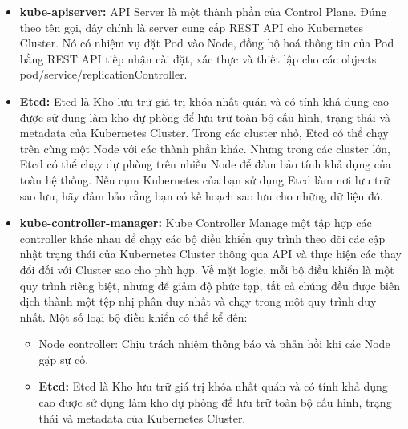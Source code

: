 \documentclass[12pt,a4paper]{report}
\begin{document}
	\begin{itemize}
	\item \textbf{kube-apiserver:}
	\smallskip
	\subitem
	API Server là một thành phần của Control Plane. Đúng theo tên gọi, đây chính là server cung cấp REST API cho Kubernetes Cluster. Nó có nhiệm vụ đặt Pod vào Node, đồng bộ hoá thông tin của Pod bằng REST API tiếp nhận cài đặt, xác thực và thiết lập cho các objects pod/service/replicationController.
	
	\item \textbf{Etcd:}
	\smallskip
	\subitem
	Etcd là Kho lưu trữ giá trị khóa nhất quán và có tính khả dụng cao được sử dụng làm kho dự phòng để lưu trữ toàn bộ cấu hình, trạng thái và metadata của Kubernetes Cluster.
	\smallskip
	\subitem Trong các cluster nhỏ, Etcd có thể chạy trên cùng một Node với các thành phần khác. Nhưng trong các cluster lớn, Etcd có thể chạy dự phòng trên nhiều Node để đảm bảo tính khả dụng của toàn hệ thống. Nếu cụm Kubernetes của bạn sử dụng Etcd làm nơi lưu trữ sao lưu, hãy đảm bảo rằng bạn có kế hoạch sao lưu cho những dữ liệu đó.
	
	\item \textbf{kube-controller-manager:}
	\smallskip
	\subitem
	Kube Controller Manage một tập hợp các controller khác nhau để chạy các bộ điều khiển quy trình theo dõi các cập nhật trạng thái của Kubernetes Cluster thông qua API và thực hiện các thay đổi đối với Cluster sao cho phù hợp. 
	\smallskip
	\subitem Về mặt logic, mỗi bộ điều khiển là một quy trình riêng biệt, nhưng để giảm độ phức tạp, tất cả chúng đều được biên dịch thành một tệp nhị phân duy nhất và chạy trong một quy trình duy nhất.
	\smallskip
	\subitem Một số loại bộ điều khiển có thể kể đến:
	\begin{itemize}
		\item Node controller: Chịu trách nhiệm thông báo và phản hồi khi các Node gặp sự cố.

		
		\item \textbf{Etcd:}
		\subitem
		Etcd là Kho lưu trữ giá trị khóa nhất quán và có tính khả dụng cao được sử dụng làm kho dự phòng để lưu trữ toàn bộ cấu hình, trạng thái và metadata của Kubernetes Cluster.
		
		\hspace{0.8cm}{Trong các cluster nhỏ, Etcd có thể chạy trên cùng một Node với các thành phần khác. Nhưng trong các cluster lớn, Etcd có thể chạy dự phòng trên nhiều Node để đảm bảo tính khả dụng của toàn hệ thống. Nếu cụm Kubernetes của bạn sử dụng Etcd làm nơi lưu trữ sao lưu, hãy đảm bảo rằng bạn có kế hoạch sao lưu cho những dữ liệu đó.}
		


\end{itemize}
\end{itemize}
\end{document}
